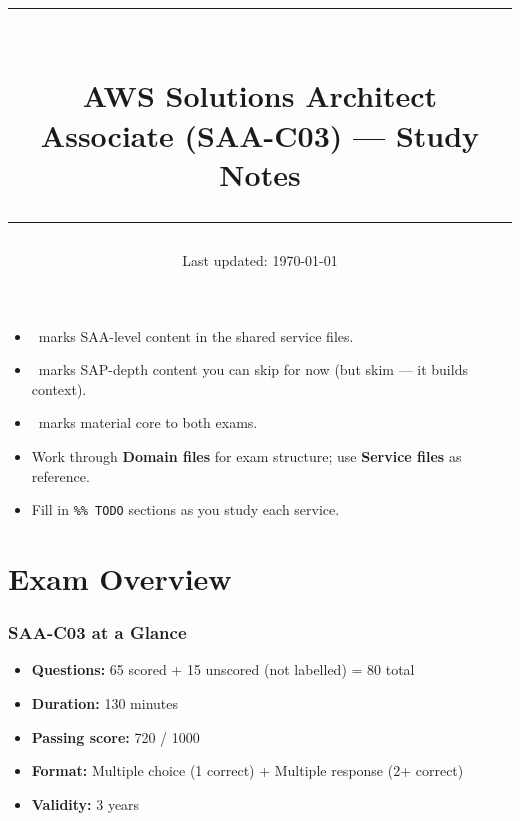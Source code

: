 \documentclass[12pt, a4paper]{article}
\title{
  \vspace{-1cm}
  {\color{awsorange}\rule{\linewidth}{3pt}}\\[8pt]
  {\Huge\bfseries\color{awsdark} AWS Solutions Architect}\\[4pt]
  {\large\color{saacolor} Associate (SAA-C03) — Study Notes}\\[6pt]
  {\color{awsorange}\rule{\linewidth}{1pt}}
  \vspace{-8pt}
}
\author{}
\date{\small Last updated: \today}
\begin{document}
\maketitle
\thispagestyle{empty}

\begin{tcolorbox}[colback=lightgray, colframe=awsdark, title=How to use these notes]
\begin{itemize}
  \item \saatag\ marks SAA-level content in the shared service files.
  \item \saptag\ marks SAP-depth content you can skip for now (but skim — it builds context).
  \item \bothtag\ marks material core to both exams.
  \item Work through \textbf{Domain files} for exam structure; use \textbf{Service files} as reference.
  \item Fill in \texttt{\%\% TODO} sections as you study each service.
\end{itemize}
\end{tcolorbox}

\vspace{1em}
\tableofcontents
\newpage

\part{Exam Overview}

\section{SAA-C03 at a Glance}

\begin{keyfacts}
\begin{itemize}
  \item \textbf{Questions:} 65 scored + 15 unscored (not labelled) = 80 total
  \item \textbf{Duration:} 130 minutes
  \item \textbf{Passing score:} 720 / 1000
  \item \textbf{Format:} Multiple choice (1 correct) + Multiple response (2+ correct)
  \item \textbf{Validity:} 3 years
\end{itemize}
\end{keyfacts}
\end{document}
